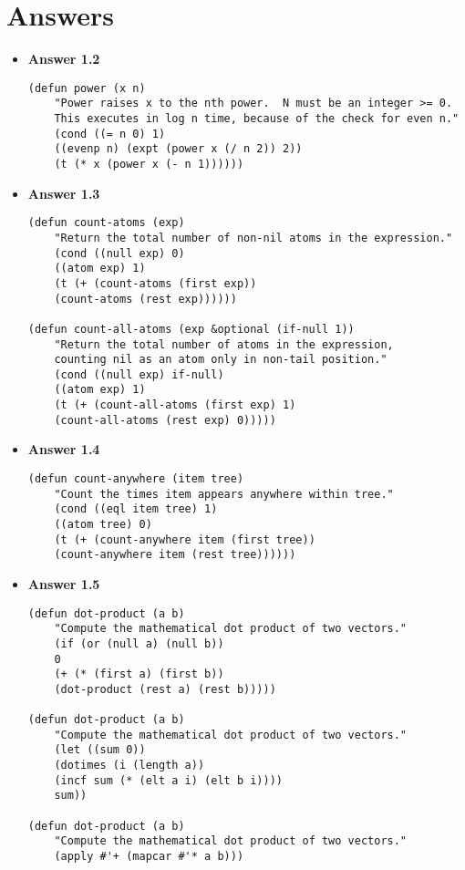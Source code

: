 \section{Answers}
\begin{itemize}
	\item \textbf{Answer 1.2 }
	\begin{lstlisting}[frame=shadowbox]
(defun power (x n)
	"Power raises x to the nth power.  N must be an integer >= 0.
	This executes in log n time, because of the check for even n."
	(cond ((= n 0) 1)
	((evenp n) (expt (power x (/ n 2)) 2))
	(t (* x (power x (- n 1))))))
	\end{lstlisting}
	\item \textbf{Answer 1.3 }
	\begin{lstlisting}[frame=shadowbox]
(defun count-atoms (exp)
	"Return the total number of non-nil atoms in the expression."
	(cond ((null exp) 0)
	((atom exp) 1)
	(t (+ (count-atoms (first exp))
	(count-atoms (rest exp))))))

(defun count-all-atoms (exp &optional (if-null 1))
	"Return the total number of atoms in the expression,
	counting nil as an atom only in non-tail position."
	(cond ((null exp) if-null)
	((atom exp) 1)
	(t (+ (count-all-atoms (first exp) 1)
	(count-all-atoms (rest exp) 0)))))
	\end{lstlisting}
	\item \textbf{Answer 1.4 }
	\begin{lstlisting}[frame=shadowbox]
(defun count-anywhere (item tree)
	"Count the times item appears anywhere within tree."
	(cond ((eql item tree) 1)
	((atom tree) 0)
	(t (+ (count-anywhere item (first tree))
	(count-anywhere item (rest tree))))))
	\end{lstlisting}
	\item \textbf{Answer 1.5 }
	\begin{lstlisting}[frame=shadowbox]
(defun dot-product (a b)
	"Compute the mathematical dot product of two vectors."
	(if (or (null a) (null b))
	0
	(+ (* (first a) (first b))
	(dot-product (rest a) (rest b)))))

(defun dot-product (a b)
	"Compute the mathematical dot product of two vectors."
	(let ((sum 0))
	(dotimes (i (length a))
	(incf sum (* (elt a i) (elt b i))))
	sum))

(defun dot-product (a b)
	"Compute the mathematical dot product of two vectors."
	(apply #'+ (mapcar #'* a b)))
	\end{lstlisting}
\end{itemize}